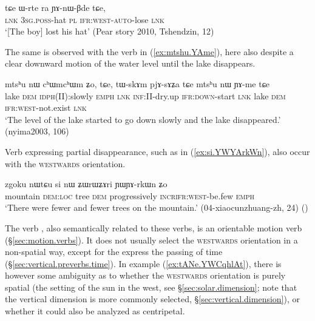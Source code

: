 \begin{exe}
\ex \label{ex:Wrte.YAnWBde}
\gll tɕe ɯ-rte ra ɲɤ-nɯ-βde tɕe, \\
\textsc{lnk} \textsc{3sg}.\textsc{poss}-hat \textsc{pl} \textsc{ifr}:\textsc{west}-\textsc{auto}-lose \textsc{lnk} \\
\glt  `[The boy] lost his hat' (Pear story 2010, Tshendzin,  12)
\end{exe} 

The same is observed with the verb  in (\ref{ex:mtshu.YAme}), here also despite a clear downward motion of the water level until the lake disappears.

\begin{exe}
\ex \label{ex:mtshu.YAme}
\gll mtsʰu nɯ cʰɯmcʰɯm ʑo, tɕe, tɯ-skɤm pjɤ-sɤʑa tɕe mtsʰu nɯ ɲɤ-me tɕe \\
lake \textsc{dem} \textsc{idph}(II):slowly \textsc{emph} \textsc{lnk} \textsc{inf}:II-dry.up \textsc{ifr}:\textsc{down}-start \textsc{lnk} lake \textsc{dem} \textsc{ifr}:\textsc{west}-not.exist \textsc{lnk} \\
\glt `The level of the lake started to go down slowly and the lake disappeared.' (nyima2003, 106)
\end{exe} 

Verb expressing partial disappearance, such as  in (\ref{ex:si.YWYArkWn}), also occur with the \textsc{westwards} orientation.

\begin{exe}
\ex \label{ex:si.YWYArkWn}
\gll zgoku nɯtɕu si nɯ ʑɯrɯʑɤri ɲɯ\redp{}ɲɤ-rkɯn ʑo \\
mountain \textsc{dem}:\textsc{loc} tree \textsc{dem} progressively \textsc{incr}\redp{}\textsc{ifr}:\textsc{west}-be.few \textsc{emph} \\
\glt `There were fewer and fewer trees on the mountain.' (04-xiaocunzhuang-zh, 24) ()
\end{exe} 

The verb , also semantically related to these verbs, is an orientable motion verb (§\ref{sec:motion.verbs}). It does not usually select the \textsc{westwards} orientation in a non-spatial way, except for the express the passing of time (§\ref{sec:vertical.preverbs.time}). In example (\ref{ex:tANe.YWCqhlAt}), there is however some ambiguity as to whether the \textsc{westwards} orientation is purely spatial (the setting of the sun in the west, see §\ref{sec:solar.dimension}; note that the vertical dimension is more commonly selected, §\ref{sec:vertical.dimension}), or whether it could also be analyzed as centripetal.
 

